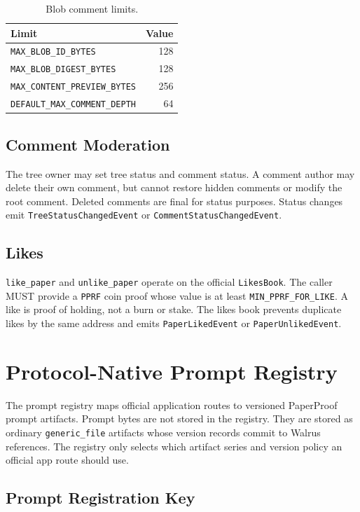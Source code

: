 \documentclass[11pt]{article}
\newcommand{\code}[1]{\texttt{#1}}
\newcommand{\pprf}{\code{PPRF}}
\begin{document}
\begin{table}[htbp]
\centering
\caption{Blob comment limits.}
\begin{tabular}{lr}
\toprule
\textbf{Limit} & \textbf{Value} \\
\midrule
\code{MAX\_BLOB\_ID\_BYTES} & 128 \\
\code{MAX\_BLOB\_DIGEST\_BYTES} & 128 \\
\code{MAX\_CONTENT\_PREVIEW\_BYTES} & 256 \\
\code{DEFAULT\_MAX\_COMMENT\_DEPTH} & 64 \\
\bottomrule
\end{tabular}
\end{table}

\subsection{Comment Moderation}

The tree owner may set tree status and comment status. A comment author may delete their own comment, but cannot restore hidden comments or modify the root comment. Deleted comments are final for status purposes. Status changes emit \code{TreeStatusChangedEvent} or \code{CommentStatusChangedEvent}.

\subsection{Likes}

\code{like\_paper} and \code{unlike\_paper} operate on the official \code{LikesBook}. The caller MUST provide a \pprf{} coin proof whose value is at least \code{MIN\_PPRF\_FOR\_LIKE}. A like is proof of holding, not a burn or stake. The likes book prevents duplicate likes by the same address and emits \code{PaperLikedEvent} or \code{PaperUnlikedEvent}.

\section{Protocol-Native Prompt Registry}

The prompt registry maps official application routes to versioned PaperProof
prompt artifacts. Prompt bytes are not stored in the registry. They are stored
as ordinary \code{generic\_file} artifacts whose version records commit to
Walrus references. The registry only selects which artifact series and version
policy an official app route should use.

\subsection{Prompt Registration Key}
\end{document}
